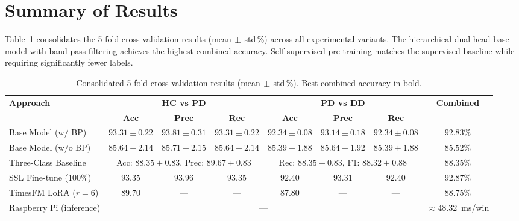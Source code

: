 \documentclass[conference]{IEEEtran}
\begin{document}
\section{Summary of Results}

Table~\ref{tab:summary} consolidates the 5-fold cross-validation results (mean$\,\pm\,$std\,\%) across all experimental variants. The hierarchical dual-head base model with band-pass filtering achieves the highest combined accuracy. Self-supervised pre-training matches the supervised baseline while requiring significantly fewer labels.

\begin{table}[t]
\centering
\caption{Consolidated 5-fold cross-validation results (mean$\,\pm\,$std\,\%). Best combined accuracy in bold.}
\label{tab:summary}
\begin{tabular}{lccccccc}
\toprule
\multirow{2}{*}{\textbf{Approach}} &
  \multicolumn{3}{c}{\textbf{HC vs PD}} &
  \multicolumn{3}{c}{\textbf{PD vs DD}} &
  \multirow{2}{*}{\textbf{Combined}} \\
\cmidrule(lr){2-4}\cmidrule(lr){5-7}
& \textbf{Acc} & \textbf{Prec} & \textbf{Rec}
& \textbf{Acc} & \textbf{Prec} & \textbf{Rec} & \\
\midrule
Base Model (w/ BP)   & $93.31{\pm}0.22$ & $93.81{\pm}0.31$ & $93.31{\pm}0.22$ & $92.34{\pm}0.08$ & $93.14{\pm}0.18$ & $92.34{\pm}0.08$ & $\mathbf{92.83\%}$ \\
Base Model (w/o BP)  & $85.64{\pm}2.14$ & $85.71{\pm}2.15$ & $85.64{\pm}2.14$ & $85.39{\pm}1.88$ & $85.64{\pm}1.92$ & $85.39{\pm}1.88$ & $85.52\%$ \\
Three-Class Baseline & \multicolumn{3}{c}{Acc: $88.35{\pm}0.83$, Prec: $89.67{\pm}0.83$} & \multicolumn{3}{c}{Rec: $88.35{\pm}0.83$, F1: $88.32{\pm}0.88$} & $88.35\%$ \\
SSL Fine-tune (100\%)& $93.35$ & $93.96$ & $93.35$ & $92.40$ & $93.31$ & $92.40$ & $92.87\%$ \\
TimesFM LoRA ($r{=}6$) & $89.70$ & --- & --- & $87.80$ & --- & --- & $88.75\%$ \\
\midrule
Raspberry Pi (inference)  & \multicolumn{6}{c}{---} & $\approx48.32$~ms/win \\
\bottomrule
\end{tabular}
\end{table}
\end{document}
